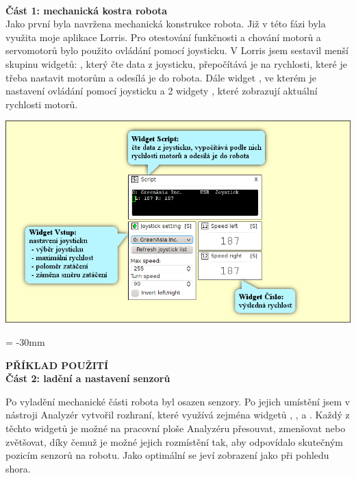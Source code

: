 \documentclass[17pt]{extreport}
\newcommand{\B}{\textbf} %
\begin{document}
\\{\large \B{Část 1: mechanická kostra robota}}\\
Jako první byla navržena mechanická konstrukce robota. Již v této fázi byla využita moje aplikace Lorris. Pro otestování funkčnosti a chování motorů a servomotorů bylo použito ovládání pomocí joysticku. V Lorris jsem sestavil menší skupinu widgetů: , který čte data z joysticku, přepočítává je na rychlosti, které je třeba nastavit motorům a odesílá je do robota. Dále widget , ve kterém je nastavení ovládání pomocí joysticku a 2 widgety , které zobrazují aktuální rychlosti motorů.
\begin{center}
\includegraphics{img/joystick2.png}
\end{center}

\newpage
\enlargethispage{100mm} %
\voffset = -30mm %
\begin{center}
    \Large \B{PŘÍKLAD POUŽITÍ \\ Část 2: ladění a nastavení senzorů}
\end{center}
\vspace{5mm}
Po vyladění mechanické části robota byl osazen senzory. Po jejich umístění jsem v nástroji Analyzér vytvořil rozhraní, které využívá zejména widgetů , ,  a . Každý z těchto widgetů je možné na pracovní ploše Analyzéru přesouvat, zmenšovat nebo zvětšovat, díky čemuž je možné jejich rozmístění tak, aby odpovídalo skutečným pozicím senzorů na robotu. Jako optimální se jeví zobrazení jako při pohledu shora.
\end{document}
